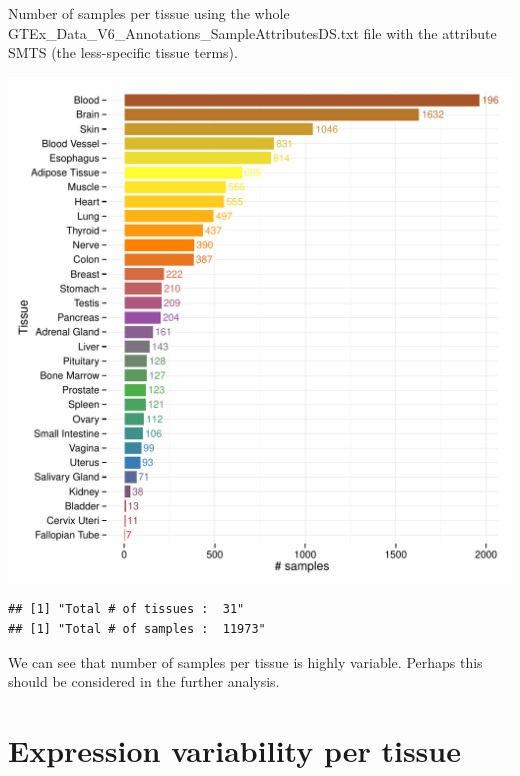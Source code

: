 \documentclass{article}\usepackage[]{graphicx}\usepackage[]{color}
\makeatletter
\def\maxwidth{ %
  \ifdim\Gin@nat@width>\linewidth
    \linewidth
  \else
    \Gin@nat@width
  \fi
}
\newenvironment{kframe}{%
 \def\at@end@of@kframe{}%
 \ifinner\ifhmode%
  \def\at@end@of@kframe{\end{minipage}}%
  \begin{minipage}{\columnwidth}%
 \fi\fi%
 \def\FrameCommand##1{\hskip\@totalleftmargin \hskip-\fboxsep
 \colorbox{shadecolor}{##1}\hskip-\fboxsep
     \hskip-\linewidth \hskip-\@totalleftmargin \hskip\columnwidth}%
 \MakeFramed {\advance\hsize-\width
   \@totalleftmargin\z@ \linewidth\hsize
   \@setminipage}}%
 {\par\unskip\endMakeFramed%
 \at@end@of@kframe}
\newenvironment{knitrout}{}{} %
\makeatother
\begin{document}
Number of samples per tissue using the whole GTEx\_Data\_V6\_Annotations\_SampleAttributesDS.txt
file with the attribute SMTS (the less-specific tissue terms).

\begin{knitrout}
\color{fgcolor}
\includegraphics[width=\maxwidth]{figure/samples_per_tissue-1} 
\begin{kframe}\begin{verbatim}
## [1] "Total # of tissues :  31"
## [1] "Total # of samples :  11973"
\end{verbatim}
\end{kframe}
\end{knitrout}

We can see that number of samples per tissue is highly variable. Perhaps this should be considered in the further analysis.

\section{Expression variability per tissue}
\end{document}
